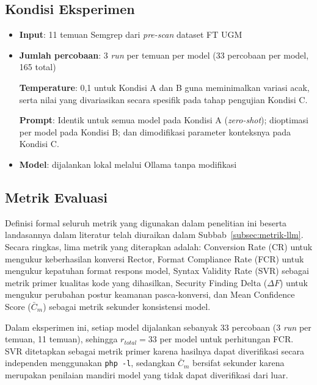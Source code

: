 \subsection{Kondisi Eksperimen}

\begin{itemize}

    \item \textbf{Input}: 11 temuan Semgrep dari \textit{pre-scan} dataset FT UGM

    \item \textbf{Jumlah percobaan}: 3 \textit{run} per temuan per model (33 percobaan per model, 165 total)

    \textbf{Temperature}: 0,1 untuk Kondisi A dan B guna meminimalkan variasi acak, serta nilai yang divariasikan secara spesifik pada tahap pengujian Kondisi C.

    \textbf{Prompt}: Identik untuk semua model pada Kondisi A (\textit{zero-shot}); dioptimasi per model pada Kondisi B; dan dimodifikasi parameter konteksnya pada Kondisi C.
    
    \item \textbf{Model}: dijalankan lokal melalui Ollama tanpa modifikasi

\end{itemize}
\subsection{Metrik Evaluasi}
\label{sec:metrik-evaluasi}

Definisi formal seluruh metrik yang digunakan dalam penelitian ini
beserta landasannya dalam literatur telah diuraikan dalam
Subbab~\ref{subsec:metrik-llm}. Secara ringkas, lima metrik yang
diterapkan adalah: Conversion Rate (CR) untuk mengukur keberhasilan
konversi Rector, Format Compliance Rate (FCR) untuk mengukur kepatuhan
format respons model, Syntax Validity Rate (SVR) sebagai metrik primer
kualitas kode yang dihasilkan, Security Finding Delta ($\Delta F$) untuk
mengukur perubahan postur keamanan pasca-konversi, dan Mean Confidence
Score ($\bar{C}_m$) sebagai metrik sekunder konsistensi model.

Dalam eksperimen ini, setiap model dijalankan sebanyak 33 percobaan
(3 \textit{run} per temuan, 11 temuan), sehingga $r_{total} = 33$ per
model untuk perhitungan FCR. SVR ditetapkan sebagai metrik primer karena
hasilnya dapat diverifikasi secara independen menggunakan \texttt{php -l},
sedangkan $\bar{C}_m$ bersifat sekunder karena merupakan penilaian mandiri
model yang tidak dapat diverifikasi dari luar.

